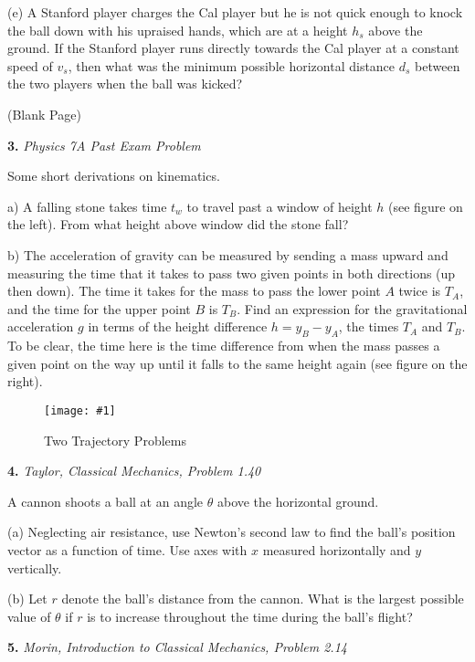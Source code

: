 \documentclass[11pt]{article}
\newcommand{\fig}[4]{
    \begin{figure}[H]
        \centering
        \texttt{[image: \#1]}
        \caption{#2}
        \label{exp4fit}
    \end{figure}
}
\theoremstyle{gangnamstyle}{\newtheorem{definition}{Definition}[]}
\theoremstyle{gangnamstyle}{\newtheorem{example}{Example}[]}
\theoremstyle{gangnamstyle}{\newtheorem{problem}{Problem}[]}
\begin{document}
(e) A Stanford player charges the Cal player but he is not quick enough to knock the ball down with his upraised hands, which are at a height $h_s$ above the ground. If the Stanford player runs directly towards the Cal player at a constant speed of $v_s$, then what was the minimum possible horizontal distance $d_s$ between the two players when the ball was kicked?

\pagebreak

\begin{center}
(Blank Page)
\end{center}

\pagebreak

\textbf{3.} \textit{Physics 7A Past Exam Problem}

Some short derivations on kinematics. 

a) A falling stone takes time $t_w$ to travel past a window of height $h$ (see figure on the left). From what height above window did the stone fall? 

b) The acceleration of gravity can be measured by sending a mass upward and measuring the time that it takes to pass two given points in both directions (up then down). The time it takes for the mass to pass the lower point $A$ twice is $T_A$, and the time for the upper point $B$ is $T_B$. Find an expression for the gravitational acceleration $g$ in terms of the height difference $h = y_B - y_A$, the times $T_A$ and $T_B$. To be clear, the time here is the time difference from when the mass passes a given point on the way up until it falls to the same height again (see figure on the right). 

\fig{figs/mt1/s182.png}{Two Trajectory Problems}{0.4}{0}

\pagebreak

\textbf{4.} \textit{Taylor, Classical Mechanics, Problem 1.40} 

A cannon shoots a ball at an angle $\theta$ above the horizontal ground. 

(a) Neglecting air resistance, use Newton's second law to find the ball's position vector as a function of time. Use axes with $x$ measured
horizontally and $y$ vertically. 

(b) Let $r$ denote the ball's distance from the cannon. What is the
largest possible value of $\theta$ if $r$ is to increase throughout the time during the ball's flight? 

\pagebreak

\textbf{5.} \textit{Morin, Introduction to Classical Mechanics, Problem 2.14} 
\end{document}
